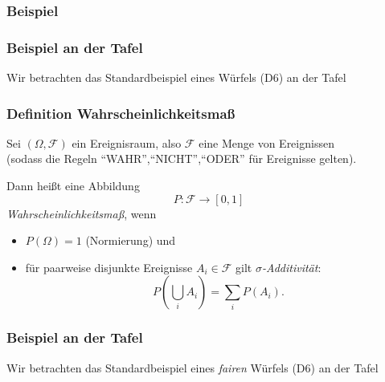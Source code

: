 \begin{frame}
  \frametitle{Beispiel}


\vspace{-4cm}


  
\end{frame}

\begin{frame}\frametitle{Beispiel an der Tafel}
  Wir betrachten das Standardbeispiel eines Würfels (D6) an der Tafel
\end{frame}

\begin{frame}\frametitle{Definition Wahrscheinlichkeitsmaß}
  Sei $(\Omega, \mathcal{F})$ ein Ereignisraum, also $\mathcal{F}$ eine Menge von Ereignissen\\
  (sodass die Regeln ``WAHR'',``NICHT'',``ODER'' für Ereignisse gelten).

  
  Dann heißt eine Abbildung
  \[P \colon \mathcal{F} \to [0,1]\]
  \emph{Wahrscheinlichkeitsmaß}, wenn
  \begin{itemize}
    \item $P(\Omega) = 1$ (Normierung) und
    \item für paarweise disjunkte Ereignisse $A_i \in \mathcal{F}$ gilt
      \emph{$\sigma$-Additivität}:
      \[P\left( \bigcup_{i} A_i\right) = \sum_i P\left(A_i\right).\]
  \end{itemize}
\end{frame}

\begin{frame}\frametitle{Beispiel an der Tafel}
  Wir betrachten das Standardbeispiel eines \emph{fairen} Würfels (D6) an der Tafel
\end{frame}

